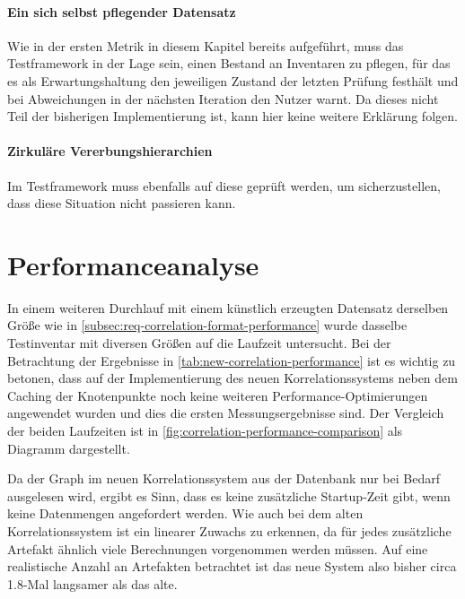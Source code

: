 \paragraph{Ein sich selbst pflegender Datensatz}
Wie in der ersten Metrik in diesem Kapitel bereits aufgeführt, muss das Testframework in der Lage sein, einen Bestand an Inventaren zu pflegen, für das es als Erwartungshaltung den jeweiligen Zustand der letzten Prüfung festhält und bei Abweichungen in der nächsten Iteration den Nutzer warnt.
Da dieses nicht Teil der bisherigen Implementierung ist, kann hier keine weitere Erklärung folgen.

\paragraph{Zirkuläre Vererbungshierarchien}
Im Testframework muss ebenfalls auf diese geprüft werden, um sicherzustellen, dass diese Situation nicht passieren kann.


\section{Performanceanalyse}\label{sec:evaluation-performanceanalyse}

In einem weiteren Durchlauf mit einem künstlich erzeugten Datensatz derselben Größe wie in \autoref{subsec:req-correlation-format-performance} wurde dasselbe Testinventar mit diversen Größen auf die Laufzeit untersucht.
Bei der Betrachtung der Ergebnisse in \autoref{tab:new-correlation-performance} ist es wichtig zu betonen, dass auf der Implementierung des neuen Korrelationssystems neben dem Caching der Knotenpunkte noch keine weiteren Performance-Optimierungen angewendet wurden und dies die ersten Messungsergebnisse sind.
Der Vergleich der beiden Laufzeiten ist in \autoref{fig:correlation-performance-comparison} als Diagramm dargestellt.

Da der Graph im neuen Korrelationssystem aus der Datenbank nur bei Bedarf ausgelesen wird, ergibt es Sinn, dass es keine zusätzliche Startup-Zeit gibt, wenn keine Datenmengen angefordert werden.
Wie auch bei dem alten Korrelationssystem ist ein linearer Zuwachs zu erkennen, da für jedes zusätzliche Artefakt ähnlich viele Berechnungen vorgenommen werden müssen.
Auf eine realistische Anzahl an Artefakten betrachtet ist das neue System also bisher circa 1.8-Mal langsamer als das alte.

